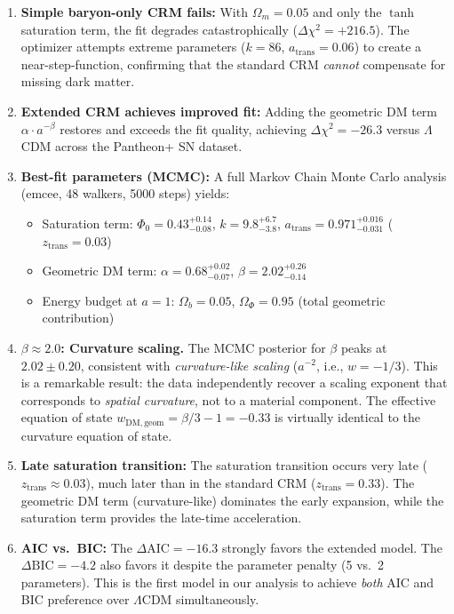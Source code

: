 \documentclass[aps,prd,twocolumn,superscriptaddress,nofootinbib,floatfix]{revtex4-2}
\begin{document}
\begin{enumerate}
\item \textbf{Simple baryon-only CRM fails:} With $\Omega_m = 0.05$ and only the $\tanh$ saturation term, the fit degrades catastrophically ($\Delta\chi^2 = +216.5$). The optimizer attempts extreme parameters ($k = 86$, $a_{\mathrm{trans}} = 0.06$) to create a near-step-function, confirming that the standard CRM \textit{cannot} compensate for missing dark matter.

\item \textbf{Extended CRM achieves improved fit:} Adding the geometric DM term $\alpha \cdot a^{-\beta}$ restores and exceeds the fit quality, achieving $\Delta\chi^2 = -26.3$ versus $\Lambda$CDM across the Pantheon+ SN dataset.

\item \textbf{Best-fit parameters (MCMC):} A full Markov Chain Monte Carlo analysis (emcee, 48 walkers, 5000 steps) yields:
\begin{itemize}
\item Saturation term: $\Phi_0 = 0.43^{+0.14}_{-0.08}$, $k = 9.8^{+6.7}_{-3.8}$, $a_{\mathrm{trans}} = 0.971^{+0.016}_{-0.031}$ ($z_{\mathrm{trans}} = 0.03$)
\item Geometric DM term: $\alpha = 0.68^{+0.02}_{-0.07}$, $\beta = 2.02^{+0.26}_{-0.14}$
\item Energy budget at $a = 1$: $\Omega_b = 0.05$, $\Omega_\Phi = 0.95$ (total geometric contribution)
\end{itemize}

\item \textbf{$\beta \approx 2.0$: Curvature scaling.} The MCMC posterior for $\beta$ peaks at $2.02 \pm 0.20$, consistent with \textit{curvature-like scaling} ($a^{-2}$, i.e., $w = -1/3$). This is a remarkable result: the data independently recover a scaling exponent that corresponds to \textit{spatial curvature}, not to a material component. The effective equation of state $w_{\mathrm{DM,geom}} = \beta/3 - 1 = -0.33$ is virtually identical to the curvature equation of state.

\item \textbf{Late saturation transition:} The saturation transition occurs very late ($z_{\mathrm{trans}} \approx 0.03$), much later than in the standard CRM ($z_{\mathrm{trans}} = 0.33$). The geometric DM term (curvature-like) dominates the early expansion, while the saturation term provides the late-time acceleration.

\item \textbf{AIC vs.\ BIC:} The $\Delta\mathrm{AIC} = -16.3$ strongly favors the extended model. The $\Delta\mathrm{BIC} = -4.2$ also favors it despite the parameter penalty (5 vs.\ 2 parameters). This is the first model in our analysis to achieve \textit{both} AIC and BIC preference over $\Lambda$CDM simultaneously.
\end{enumerate}
\end{document}
